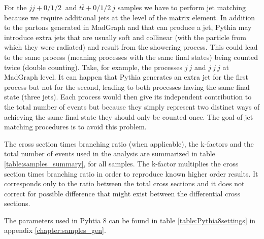 For the $jj+0/1/2 ~$ and $t\overline{t}+0/1/2 ~j$ samples we have to perform jet matching because we require additional jets at the level of the matrix element. In addition to the partons generated in MadGraph and that can produce a jet, Pythia may introduce extra jets that are usually soft and collinear (with the particle from which they were radiated) and result from the showering process. This could lead to the same process (meaning processes with the same final states) being counted twice (double counting). Take, for example, the processes $j~j$ and  $j~j~j$ at MadGraph level. It can happen that Pythia generates an extra jet for the first process but not for the second, leading to both processes having the same final state (three jets). Each process would then give its independent contribution to the total number of events but because they simply represent two distinct ways of achieving the same final state they should only be counted once. The goal of jet matching procedures is to avoid this problem. 


The cross section times branching ratio (when applicable), the k-factors and the total number of events used in the analysis are summarized in table \ref{table:samples_summary}, for all samples. The k-factor multiplies the cross section times branching ratio in order to reproduce known higher order results. It corresponds only to the ratio between the total cross sections and it does not correct for possible difference that might exist between the differential cross sections.

The parameters used in Pyhtia 8 can be found in table \ref{table:Pythia8settings} in appendix \ref{chapter:samples_gen}.

